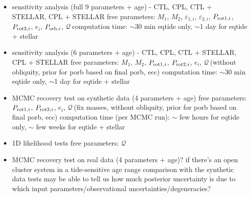 \documentclass[]{aastex631}
\newcommand{\prot}[1]{$P_{{\rm rot} {#1}}$}
\newcommand{\porb}[1]{$P_{{\rm orb} {#1}}$}
\newcommand{\ob}[1]{$\varepsilon_{#1}$}
\newcommand{\ecc}[1]{$e_{#1}$}
\newcommand{\tq}[1]{$\mathcal{Q}_{#1}$}
\newcommand{\mpri}{$M_1$}
\newcommand{\msec}{$M_2$}
\begin{document}
\begin{itemize}
	\item sensitivity analysis (full 9 parameters + age) - CTL, CPL, CTL + STELLAR, CPL + STELLAR
		\subitem free parameters: \mpri, \msec, \ob{1,i}, \ob{2,i}, \prot{1,i}, \prot{2,i}, \ecc{i}, \porb{,i}, \tq\
		\subitem computation time: $\sim$30 min eqtide only, $\sim$1 day for eqtide + stellar
	\item sensitivity analysis (6 parameters + age) - CTL, CPL, CTL + STELLAR, CPL + STELLAR
		\subitem free parameters: \mpri, \msec, \prot{1,i}, \prot{2,i}, \ecc{i}, \tq\ (without obliquity, prior for porb based on final porb, ecc)
		\subitem computation time: $\sim$30 min eqtide only, $\sim$1 day for eqtide + stellar
	\item MCMC recovery test on synthetic data (4 parameters + age)
		\subitem free parameters: \prot{1,i}, \prot{2,i}, \ecc{i}, \tq\ (fix masses, without obliquity, prior for porb based on final porb, ecc)
		\subitem computation time (per MCMC run): $\sim$ few hours for eqtide only, $\sim$ few weeks for eqtide + stellar
	\item 1D likelihood tests
		\subitem free parameters: \tq\
	\item MCMC recovery test on real data (4 parameters + age)?
		\subitem if there's an open cluster system in a tide-sensitive age range
		\subitem comparison with the synthetic data tests may be able to tell us how much posterior uncertainty is due to which input parameters/observational uncertainties/degeneracies?
\end{itemize}
\end{document}
